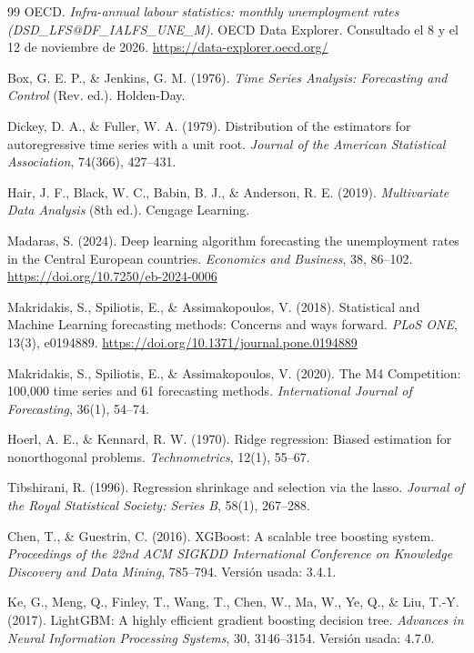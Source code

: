 \documentclass[11pt]{article}
\begin{document}
\begin{thebibliography}{99}
 OECD. \textit{Infra-annual labour statistics: monthly unemployment rates (DSD\_LFS@DF\_IALFS\_UNE\_M)}. OECD Data Explorer. Consultado el 8 y el 12 de noviembre de 2026. \url{https://data-explorer.oecd.org/}

 Box, G. E. P., \& Jenkins, G. M. (1976). \textit{Time Series Analysis: Forecasting and Control} (Rev. ed.). Holden-Day.

 Dickey, D. A., \& Fuller, W. A. (1979). Distribution of the estimators for autoregressive time series with a unit root. \textit{Journal of the American Statistical Association}, 74(366), 427--431.

 Hair, J. F., Black, W. C., Babin, B. J., \& Anderson, R. E. (2019). \textit{Multivariate Data Analysis} (8th ed.). Cengage Learning.

 Madaras, S. (2024). Deep learning algorithm forecasting the unemployment rates in the Central European countries. \textit{Economics and Business}, 38, 86--102. \url{https://doi.org/10.7250/eb-2024-0006}

 Makridakis, S., Spiliotis, E., \& Assimakopoulos, V. (2018). Statistical and Machine Learning forecasting methods: Concerns and ways forward. \textit{PLoS ONE}, 13(3), e0194889. \url{https://doi.org/10.1371/journal.pone.0194889}

 Makridakis, S., Spiliotis, E., \& Assimakopoulos, V. (2020). The M4 Competition: 100,000 time series and 61 forecasting methods. \textit{International Journal of Forecasting}, 36(1), 54--74.

 Hoerl, A. E., \& Kennard, R. W. (1970). Ridge regression: Biased estimation for nonorthogonal problems. \textit{Technometrics}, 12(1), 55--67.

 Tibshirani, R. (1996). Regression shrinkage and selection via the lasso. \textit{Journal of the Royal Statistical Society: Series B}, 58(1), 267--288.

 Chen, T., \& Guestrin, C. (2016). XGBoost: A scalable tree boosting system. \textit{Proceedings of the 22nd ACM SIGKDD International Conference on Knowledge Discovery and Data Mining}, 785--794. Versión usada: 3.4.1.

 Ke, G., Meng, Q., Finley, T., Wang, T., Chen, W., Ma, W., Ye, Q., \& Liu, T.-Y. (2017). LightGBM: A highly efficient gradient boosting decision tree. \textit{Advances in Neural Information Processing Systems}, 30, 3146--3154. Versión usada: 4.7.0.


\end{thebibliography}
\end{document}
